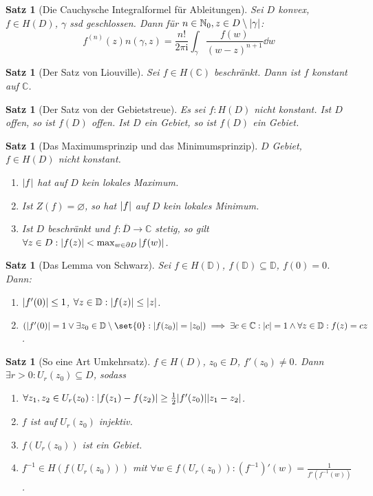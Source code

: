 \documentclass[a4paper]{article}
\theoremstyle{marginbreak}
\newtheorem{satz}[definition]{Satz}
\newcommand{\C}{\mathbb{C}}
\renewcommand{\i}{\mathrm{i}}
\newcommand{\D}{\mathbb{D}}
\begin{document}
	\begin{satz}[Die Cauchysche Integralformel für Ableitungen]
		Sei $D$ konvex, $f\in H(D)$, $\gamma$ ssd geschlossen. Dann für $n\in\mathbb{N}_0, z\in D\setminus\abs{\gamma}$:
		\[
			f^{(n)}(z)n(\gamma, z) = \frac{n!}{2\pi\i}\int_\gamma \frac{f(w)}{(w-z)^{n+1}}\dd{w}
		\]
	\end{satz}
	\begin{satz}[Der Satz von Liouville]
		Sei $f\in H(\C)$ beschränkt. Dann ist $f$ konstant auf $\C$.
	\end{satz} %
	\begin{satz}[Der Satz von der Gebietstreue]
		Es sei $f\colon H(D)$ nicht konstant. Ist $D$ offen, so ist $f(D)$ offen. Ist $D$ ein Gebiet, so ist $f(D)$ ein Gebiet.
	\end{satz}
	\begin{satz}[Das Maximumsprinzip und das Minimumsprinzip]
		$D$ Gebiet, $f\in H(D)$ nicht konstant.
		\begin{enumerate}[label=(\alph*)]
			\item $\abs{f}$ hat auf $D$ kein lokales Maximum.
			\item Ist $Z(f)=\varnothing$, so hat $\abs{f}$ auf $D$ kein lokales Minimum.
			\item Ist $D$ beschränkt und $f\colon\overline{D}\to\C$ stetig, so gilt $\forall z\in D: \abs{f(z)} < \max_{w\in\partial D}\abs{f(w)}$.
		\end{enumerate}
	\end{satz}
	\begin{satz}[Das Lemma von Schwarz]
		Sei $f\in H(\D)$, $f(\D)\subseteq\D$, $f(0)=0$. Dann:
		\begin{enumerate}[label=(\alph*)]
			\item $\abs{f'(0)}\leq 1$, $\forall z\in\D:\abs{f(z)}\leq \abs{z}$.
			\item $(\abs{f'(0)}=1\vee\exists z_0\in\D\setminus\set{0}:\abs{f(z_0)}=\abs{z_0})\implies\exists c\in\C:\abs{c}=1\wedge\forall z\in\D:
				f(z)=cz$.
		\end{enumerate}
	\end{satz}
	\begin{satz}[So eine Art Umkehrsatz]
		$f\in H(D)$, $z_0\in D$, $f'(z_0)\neq 0$. Dann $\exists r>0:U_r(z_0)\subseteq D$, sodass
		\begin{enumerate}[label=(\alph*)]
			\item $\forall z_1, z_2\in U_r(z_0): \abs{f(z_1)-f(z_2)}\geq\frac{1}{2}\abs{f'(z_0)}\abs{z_1-z_2}$.
			\item $f$ ist auf $U_r(z_0)$ injektiv.
			\item $f(U_r(z_0))$ ist ein Gebiet.
			\item $f^{-1}\in H(f(U_r(z_0)))$ mit $\forall w\in f(U_r(z_0)): (f^{-1})'(w)=\frac{1}{f'(f^{-1}(w))}$.
		\end{enumerate}
	\end{satz}
\end{document}
